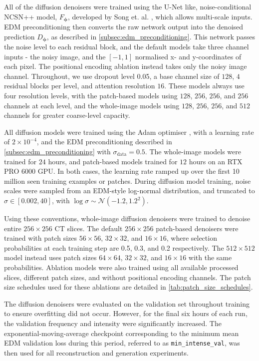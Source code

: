 All of the diffusion denoisers were trained using the U-Net like, noise-conditional NCSN++ model, $F_{\boldsymbol{\phi}}$, developed by Song et. al. \cite{song...}, which allows multi-scale inputs. EDM preconditioning then converts the raw network output into the denoised prediction $D_{\boldsymbol{\phi}}$, as described in \autoref{subsec:edm_preconditioning}. This network passes the noise level to each residual block, and the default models take three channel inputs - the noisy image, and the $[-1,1]$ normalised x- and y-coordinates of each pixel. The positional encoding ablation instead takes only the noisy image channel. Throughout, we use dropout level 0.05, a base channel size of $128$, $4$ residual blocks per level, and attention resolution $16$. These models always use four resolution levels, with the patch-based models using $128$, $256$, $256$, and $256$ channels at each level, and the whole-image models using $128$, $256$, $256$, and $512$ channels for greater coarse-level capacity.

All diffusion models were trained using the Adam optimiser \cite{kingma}, with a learning rate of $2 \times 10^{-4}$, and the EDM preconditioning described in \autoref{subsec:edm_preconditioning} with $\sigma_{\mathrm{data}}=0.5$. The whole-image models were trained for $24$ hours, and patch-based models trained for $12$ hours on an RTX PRO 6000 GPU. In both cases, the learning rate ramped up over the first 10 million seen training examples or patches. During diffusion model training, noise scales were sampled from an EDM-style log-normal distribution, and truncated to $\sigma\in[0.002,40]$, with $\log\sigma\sim\mathcal{N}(-1.2,1.2^2)$.

Using these conventions, whole-image diffusion denoisers were trained to denoise entire $256\times 256$ CT slices. The default $256\times256$ patch-based denoisers were trained with patch sizes $56\times56$, $32\times32$, and $16\times16$, where selection probabilities at each training step are 0.5, 0.3, and 0.2 respectively. The $512\times512$ model instead uses patch sizes $64\times64$, $32\times32$, and $16\times16$ with the same probabilities. Ablation models were also trained using all available processed slices, different patch sizes, and without positional encoding channels. The patch size schedules used for these ablations are detailed in \autoref{tab:patch_size_schedules}.

The diffusion denoisers were evaluated on the validation set throughout training to ensure overfitting did not occur. However, for the final six hours of each run, the validation frequency and intensity were significantly increased. The exponential-moving-average checkpoint corresponding to the minimum mean EDM validation loss during this period, referred to as \texttt{min\_intense\_val}, was then used for all reconstruction and generation experiments.

